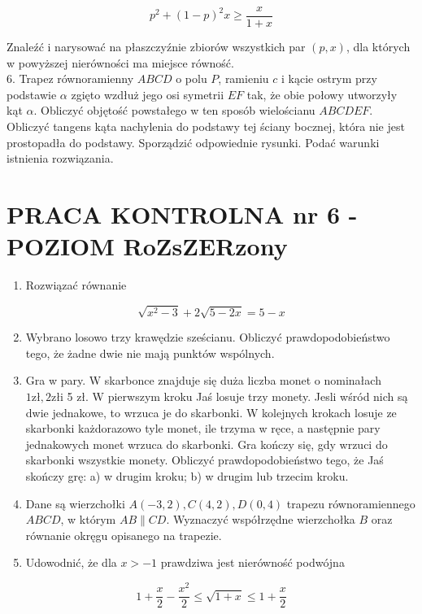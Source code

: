 \documentclass[10pt]{article}
\begin{document}
$$
p^{2}+(1-p)^{2} x \geqslant \frac{x}{1+x}
$$

Znaleźć i narysować na płaszczyźnie zbiorów wszystkich par $(p, x)$, dla których w powyższej nierówności ma miejsce równość.\\
6. Trapez równoramienny $A B C D$ o polu $P$, ramieniu $c$ i kącie ostrym przy podstawie $\alpha$ zgięto wzdłuż jego osi symetrii $E F$ tak, że obie połowy utworzyły kąt $\alpha$. Obliczyć objętość powstałego w ten sposób wielościanu $A B C D E F$. Obliczyć tangens kąta nachylenia do podstawy tej ściany bocznej, która nie jest prostopadła do podstawy. Sporządzić odpowiednie rysunki. Podać warunki istnienia rozwiązania.

\section*{PRACA KONTROLNA nr 6 - POZIOM RoZsZERzony}
\begin{enumerate}
  \item Rozwiązać równanie
\end{enumerate}

$$
\sqrt{x^{2}-3}+2 \sqrt{5-2 x}=5-x
$$

\begin{enumerate}
  \setcounter{enumi}{1}
  \item Wybrano losowo trzy krawędzie sześcianu. Obliczyć prawdopodobieństwo tego, że żadne dwie nie mają punktów wspólnych.
  \item Gra w pary. W skarbonce znajduje się duża liczba monet o nominałach $1 \mathrm{zł}, 2 \mathrm{zł} \mathrm{i}$ 5 zł. W pierwszym kroku Jaś losuje trzy monety. Jesli wśród nich są dwie jednakowe, to wrzuca je do skarbonki. W kolejnych krokach losuje ze skarbonki każdorazowo tyle monet, ile trzyma w ręce, a następnie pary jednakowych monet wrzuca do skarbonki. Gra kończy się, gdy wrzuci do skarbonki wszystkie monety. Obliczyć prawdopodobieństwo tego, że Jaś skończy grę: a) w drugim kroku; b) w drugim lub trzecim kroku.
  \item Dane są wierzchołki $A(-3,2), C(4,2), D(0,4)$ trapezu równoramiennego $A B C D$, w którym $A B \| C D$. Wyznaczyć współrzędne wierzchołka $B$ oraz równanie okręgu opisanego na trapezie.
  \item Udowodnić, że dla $x>-1$ prawdziwa jest nierówność podwójna
\end{enumerate}

$$
1+\frac{x}{2}-\frac{x^{2}}{2} \leqslant \sqrt{1+x} \leqslant 1+\frac{x}{2}
$$
\end{document}
